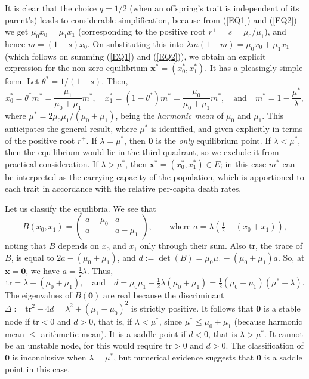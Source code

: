 \documentclass[12pt]{article}
\newcommand{\tr}{\text{tr}}
\newcommand{\bzero}{\boldsymbol{0}}
\newcommand{\bx}{\boldsymbol{x}}
\begin{document}
It is clear that the choice $q=1/2$ (when an offspring's trait is 
independent of its parent's) leads to considerable simplification,
because from (\ref{EQ1}) and (\ref{EQ2}) we get
$\mu_0 x_0=\mu_1 x_1$ (corresponding to the
positive root $r^+=s=\mu_0/\mu_1$), and hence $m=(1+s)x_0$. 
On substituting this into
$\lambda m(1-m)= \mu_0 x_0+\mu_1 x_1$ (which follows on summing (\ref{EQ1}) 
and (\ref{EQ2})), we obtain an explicit expression 
for the non-zero equilibrium $\bx^*=(x_0^*,x_1^*)$. It has a pleasingly simple
form. Let $\theta^*=1/(1+s)$. Then,
\begin{equation}
x_0^*
=\theta^* m^*
=\frac{\mu_1}{\mu_0+\mu_1} m^*,
\quad
x_1^*
=(1-\theta^*) m^*
=\frac{\mu_0}{\mu_0+\mu_1} m^*,
\quad \text{and} \quad
m^*=1-\frac{\mu^*}{\lambda},
\label{EQmuconstant}
\end{equation}
where $\mu^*=2\mu_0\mu_1/(\mu_0+\mu_1)$, being the
{\em harmonic mean\/} of $\mu_0$ and $\mu_1$.
This anticipates the general result, where $\mu^*$ is identified,
and given explicitly in terms of the positive root $r^+$.
If $\lambda=\mu^*$, then $\bzero$ is the {\em only\/} equilibrium point.
If $\lambda<\mu^*$, then the equilibrium would lie in the third
quadrant, so we exclude it from practical consideration.
If $\lambda>\mu^*$, then $\bx^*=(x_0^*,x_1^*)\in E$; in this case
$m^*$ can be interpreted as the carrying capacity of the population,
which is apportioned to each trait in accordance with the relative
per-capita death rates.

Let us classify the equilibria. We see that
$$
B(x_0,x_1)=
\left(
\begin{matrix}
a-\mu_0 & a \\
a & a-\mu_1  
\end{matrix}
\right),
\qquad \text{where } a=\lambda(\tfrac12-(x_0+x_1)),
$$
noting that $B$ depends on $x_0$ and $x_1$ only through their sum.
Also $\tr$, the trace of $B$, is equal to $2a-(\mu_0+\mu_1)$, 
and $d:=\det(B)=\mu_0\mu_1 - (\mu_0+\mu_1)a$.
So, at $\bx=\bzero$, we have $a=\tfrac12 \lambda$. Thus, 
$$
\tr=\lambda-(\mu_0+\mu_1), 
\quad\text{and}\quad
d= \mu_0\mu_1 - \tfrac12 \lambda (\mu_0+\mu_1)
=\tfrac12 (\mu_0+\mu_1)(\mu^*-\lambda).
$$
The eigenvalues of $B(\bzero)$ are real because
the discriminant $\Delta:=\tr^2-4d=\lambda^2 + (\mu_1-\mu_0)^2$ is strictly
positive.
It follows that $\bzero$ is a stable node if $\tr<0$ and $d>0$,
that is, if $\lambda<\mu^*$, 
since $\mu^*\leq \mu_0+\mu_1$ (because 
harmonic mean $\leq$ arithmetic mean).
It is a saddle point if $d<0$,
that is $\lambda>\mu^*$. It cannot be an unstable node, for this 
would require $\tr>0$ and $d>0$. 
The classification of $\bzero$ is inconclusive when $\lambda=\mu^*$,
but numerical evidence suggests that
$\bzero$ is a saddle point in this case.
\end{document}
